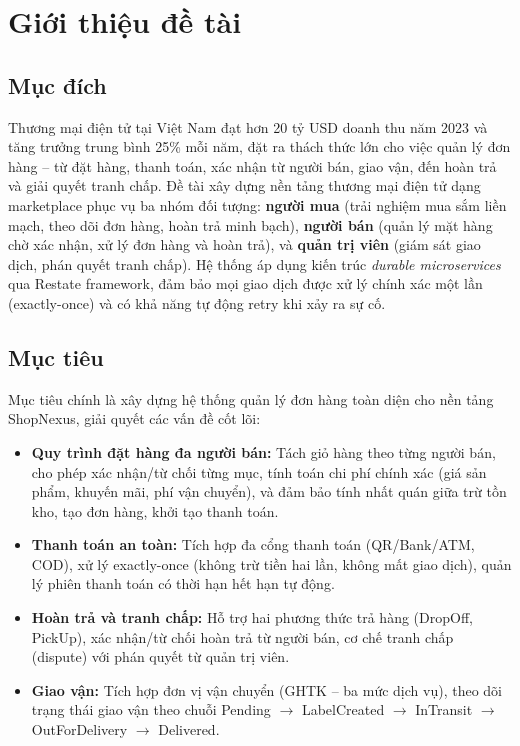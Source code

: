 \chapter{Giới thiệu đề tài}

\section{Mục đích}

Thương mại điện tử tại Việt Nam đạt hơn 20 tỷ USD doanh thu năm 2023 và tăng trưởng trung bình 25\% mỗi năm, đặt ra thách thức lớn cho việc quản lý đơn hàng -- từ đặt hàng, thanh toán, xác nhận từ người bán, giao vận, đến hoàn trả và giải quyết tranh chấp. Đề tài xây dựng nền tảng thương mại điện tử dạng marketplace phục vụ ba nhóm đối tượng: \textbf{người mua} (trải nghiệm mua sắm liền mạch, theo dõi đơn hàng, hoàn trả minh bạch), \textbf{người bán} (quản lý mặt hàng chờ xác nhận, xử lý đơn hàng và hoàn trả), và \textbf{quản trị viên} (giám sát giao dịch, phán quyết tranh chấp). Hệ thống áp dụng kiến trúc \textit{durable microservices} qua Restate framework, đảm bảo mọi giao dịch được xử lý chính xác một lần (exactly-once) và có khả năng tự động retry khi xảy ra sự cố.

\section{Mục tiêu}

Mục tiêu chính là xây dựng hệ thống quản lý đơn hàng toàn diện cho nền tảng ShopNexus, giải quyết các vấn đề cốt lõi:

\begin{itemize}
    \item \textbf{Quy trình đặt hàng đa người bán:} Tách giỏ hàng theo từng người bán, cho phép xác nhận/từ chối từng mục, tính toán chi phí chính xác (giá sản phẩm, khuyến mãi, phí vận chuyển), và đảm bảo tính nhất quán giữa trừ tồn kho, tạo đơn hàng, khởi tạo thanh toán.

    \item \textbf{Thanh toán an toàn:} Tích hợp đa cổng thanh toán (QR/Bank/ATM, COD), xử lý exactly-once (không trừ tiền hai lần, không mất giao dịch), quản lý phiên thanh toán có thời hạn hết hạn tự động.

    \item \textbf{Hoàn trả và tranh chấp:} Hỗ trợ hai phương thức trả hàng (DropOff, PickUp), xác nhận/từ chối hoàn trả từ người bán, cơ chế tranh chấp (dispute) với phán quyết từ quản trị viên.

    \item \textbf{Giao vận:} Tích hợp đơn vị vận chuyển (GHTK -- ba mức dịch vụ), theo dõi trạng thái giao vận theo chuỗi Pending $\rightarrow$ LabelCreated $\rightarrow$ InTransit $\rightarrow$ OutForDelivery $\rightarrow$ Delivered.
\end{itemize}

